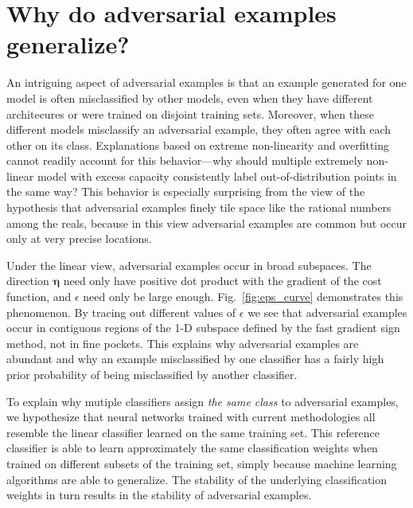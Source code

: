 \documentclass{article} %
\def\eps{{\epsilon}}
\def\veta{{\bm{\eta}}}
\begin{document}
\section{Why do adversarial examples generalize?}

An intriguing aspect of adversarial examples is that an example generated
for one model is often misclassified by other models, even when they
have different architecures or were trained on disjoint training sets.
Moreover, when these different models misclassify an adversarial example, they often
agree with each other on its class.
Explanations based on extreme non-linearity and overfitting cannot readily account
for this behavior---why should multiple extremely non-linear model with excess capacity
consistently label out-of-distribution points in the same way? 
This behavior is especially surprising from the view of the hypothesis that adversarial
examples finely tile space like the rational numbers among the reals, because in this
view adversarial examples are common but occur only at very precise locations.

Under the linear view, adversarial examples occur in broad subspaces. The direction $\veta$
need only have positive dot product with the gradient of the cost function,
and $\eps$ need only be large enough.
Fig.~\ref{fig:eps_curve} demonstrates this phenomenon. By tracing out different values
of $\eps$ we see that adversarial examples occur in contiguous regions of the 1-D subspace
defined by the fast gradient sign method, not in fine pockets. This explains why
adversarial examples are abundant and why an example misclassified by one classifier
has a fairly high prior probability of being misclassified by another classifier.

To explain why mutiple classifiers assign {\em the same class} to adversarial examples,
we hypothesize that neural networks
trained with current methodologies all resemble the linear classifier
learned on the same training set.
This reference classifier is able to learn approximately
the same classification weights when trained on different subsets of the training
set, simply because machine learning algorithms are able to generalize.
The stability of the underlying classification weights in turn results in the stability
of adversarial examples.
\end{document}
